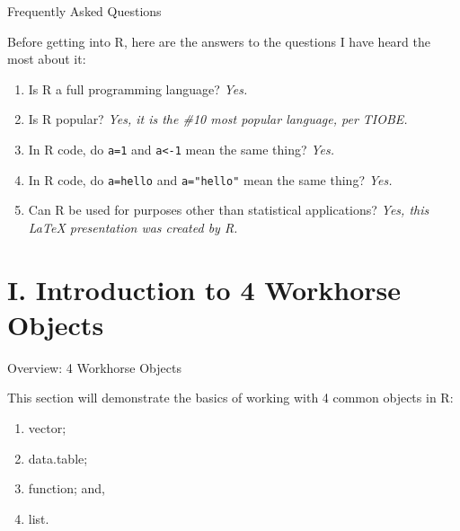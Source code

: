 \documentclass[10pt,ignorenonframetext,]{beamer}
\providecommand{\tightlist}{%
\setlength{\itemsep}{0pt}\setlength{\parskip}{0pt}}
\begin{document}
\begin{frame}[fragile]{Frequently Asked Questions}

Before getting into R, here are the answers to the questions I have
heard the most about it:

\begin{enumerate}
\def\labelenumi{\arabic{enumi}.}
\tightlist
\item
  Is R a full programming language? \emph{Yes.}
\item
  Is R popular? \emph{Yes, it is the \#10 most popular language, per
  TIOBE.}
\item
  In R code, do \texttt{a=1} and \texttt{a\textless{}-1} mean the same
  thing? \emph{Yes.}
\item
  In R code, do \texttt{a=\textquotesingle{}hello\textquotesingle{}} and
  \texttt{a="hello"} mean the same thing? \emph{Yes.}
\item
  Can R be used for purposes other than statistical applications?
  \emph{Yes, this LaTeX presentation was created by R.}
\end{enumerate}

\end{frame}

\section{I. Introduction to 4 Workhorse
Objects}\label{i.-introduction-to-4-workhorse-objects}

\begin{frame}{Overview: 4 Workhorse Objects}

This section will demonstrate the basics of working with 4 common
objects in R:

\begin{enumerate}
\def\labelenumi{\arabic{enumi}.}
\tightlist
\item
  vector;
\item
  data.table;
\item
  function; and,
\item
  list.
\end{enumerate}

\end{frame}
\end{document}
